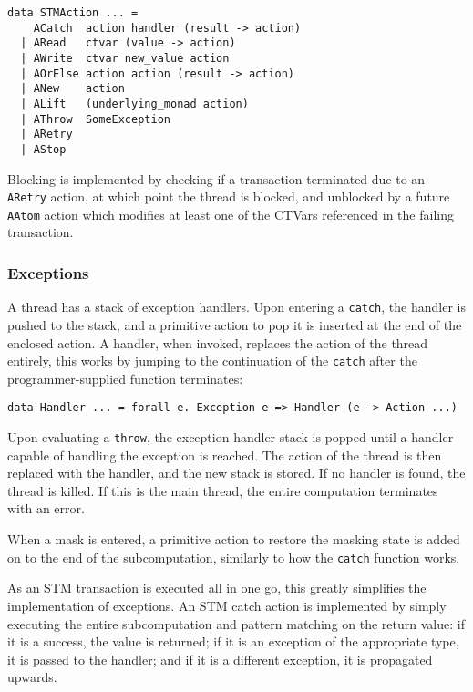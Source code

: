 \begin{verbatim}
data STMAction ... =
    ACatch  action handler (result -> action)
  | ARead   ctvar (value -> action)
  | AWrite  ctvar new_value action
  | AOrElse action action (result -> action)
  | ANew    action
  | ALift   (underlying_monad action)
  | AThrow  SomeException
  | ARetry
  | AStop
\end{verbatim}

Blocking is implemented by checking if a transaction terminated due to
an \texttt{ARetry} action, at which point the thread is blocked, and
unblocked by a future \texttt{AAtom} action which modifies at least
one of the CTVars referenced in the failing transaction.

\subsubsection*{Exceptions}
\label{sec:prelims-dejafu-impl-excs}

A thread has a stack of exception handlers. Upon entering a
\texttt{catch}, the handler is pushed to the stack, and a primitive
action to pop it is inserted at the end of the enclosed action. A
handler, when invoked, replaces the action of the thread entirely,
this works by jumping to the continuation of the \texttt{catch} after
the programmer-supplied function terminates:

\begin{verbatim}
data Handler ... = forall e. Exception e => Handler (e -> Action ...)
\end{verbatim}

Upon evaluating a \texttt{throw}, the exception handler stack is
popped until a handler capable of handling the exception is
reached. The action of the thread is then replaced with the handler,
and the new stack is stored. If no handler is found, the thread is
killed. If this is the main thread, the entire computation terminates
with an error.

When a mask is entered, a primitive action to restore the masking
state is added on to the end of the subcomputation, similarly to how
the \texttt{catch} function works.

As an STM transaction is executed all in one go, this greatly
simplifies the implementation of exceptions. An STM catch action is
implemented by simply executing the entire subcomputation and pattern
matching on the return value: if it is a success, the value is
returned; if it is an exception of the appropriate type, it is passed
to the handler; and if it is a different exception, it is propagated
upwards.

